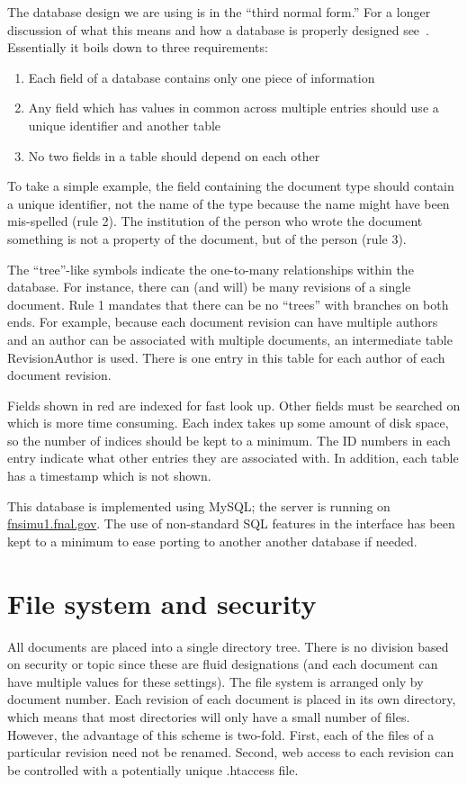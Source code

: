 \documentclass[12pt]{article}
\begin{document}
The database design we are using is in the ``third normal form.'' For a longer
discussion of what this means and how a database is properly designed
see~\cite{YargerReeseKing:1999}. Essentially it boils down to three requirements:
\begin{enumerate}
\item{Each field of a database contains only one piece of information}
\item{Any field which has values in common across multiple entries should use a
unique identifier and another table}
\item{No two fields in a table should depend on each other}
\end{enumerate}
To take a simple example, the field containing the document type should contain
a unique identifier, not the name of the type because the name might have been
mis-spelled (rule 2). The institution of the person who wrote the document
something is not a property of the document, but of the person (rule 3).

The ``tree''-like
symbols indicate the one-to-many relationships within the database. For
instance, there can (and will) be many revisions of a  single document.  Rule 1
mandates that there can be no ``trees'' with branches on both ends. For example,
because each document revision can have multiple authors and an author can be associated with
multiple documents, an intermediate table RevisionAuthor is used. There is one entry
in this table for each author of each document revision.

Fields shown in red are indexed for fast look up. Other fields must be searched
on which is more time consuming. Each index takes up some  amount of disk
space, so the number of indices should be kept to a minimum. The ID
numbers in each entry indicate what other entries they are associated with. In
addition, each table has a timestamp which is not shown.

This database is implemented using MySQL; the server is running on
\url{fnsimu1.fnal.gov}.  The use of non-standard SQL features in the interface has
been kept to a minimum to ease porting to another another database if needed.

\section{File system and security}

All documents are placed into a single directory tree. There is no 
division based on security or topic since these are fluid designations 
(and each document can have multiple values for these settings). The 
file system is arranged only by document number. Each revision of each 
document is placed in its own directory, which means that most 
directories will only have a small number of files. However, the 
advantage of this scheme is two-fold. First, each of the files of a 
particular revision need not be renamed. Second, web access to each 
revision can be controlled with a potentially unique .htaccess file.
\end{document}
